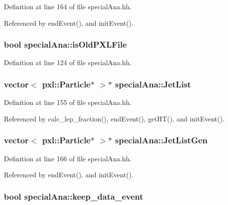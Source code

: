 Definition at line 164 of file special\-Ana.\-hh.



Referenced by end\-Event(), and init\-Event().

\subsubsection[{is\-Old\-P\-X\-L\-File}]{\setlength{\rightskip}{0pt plus 5cm}bool special\-Ana\-::is\-Old\-P\-X\-L\-File}\label{classspecialAna_add184c9cd673ecf710b3801749931b03}


Definition at line 124 of file special\-Ana.\-hh.

\subsubsection[{Jet\-List}]{\setlength{\rightskip}{0pt plus 5cm}vector$<$ pxl\-::\-Particle$\ast$ $>$$\ast$ special\-Ana\-::\-Jet\-List}\label{classspecialAna_a3d7eb132203a986d49e303ba8cdd606f}


Definition at line 155 of file special\-Ana.\-hh.



Referenced by calc\-\_\-lep\-\_\-fraction(), end\-Event(), get\-H\-T(), and init\-Event().

\subsubsection[{Jet\-List\-Gen}]{\setlength{\rightskip}{0pt plus 5cm}vector$<$ pxl\-::\-Particle$\ast$ $>$$\ast$ special\-Ana\-::\-Jet\-List\-Gen}\label{classspecialAna_aaab9fa9e1d1e85bc1ff931569a709096}


Definition at line 166 of file special\-Ana.\-hh.



Referenced by end\-Event(), and init\-Event().

\subsubsection[{keep\-\_\-data\-\_\-event}]{\setlength{\rightskip}{0pt plus 5cm}bool special\-Ana\-::keep\-\_\-data\-\_\-event}\label{classspecialAna_affbbcba600d494b2dbb3397bea059672}



